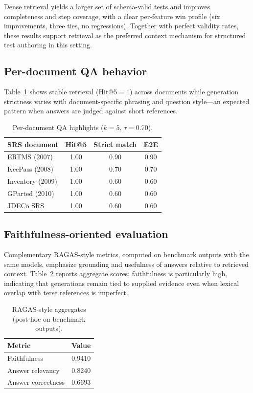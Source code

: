 \documentclass[conference]{IEEEtran}
\begin{document}
Dense retrieval yields a larger set of schema-valid tests and improves completeness and step coverage, with a clear per-feature win profile (six improvements, three ties, no regressions). Together with perfect validity rates, these results support retrieval as the preferred context mechanism for structured test authoring in this setting.

\subsection{Per-document QA behavior}

Table~\ref{tab:per_srs_results} shows stable retrieval (Hit@5${=}1$) across documents while generation strictness varies with document-specific phrasing and question style---an expected pattern when answers are judged against short references.

\begin{table}[h]
\centering
\caption{Per-document QA highlights ($k{=}5$, $\tau{=}0.70$).}
\label{tab:per_srs_results}
\begin{tabular}{lccc}
\hline
SRS document & Hit@5 & Strict match & E2E \\
\hline
ERTMS (2007) & 1.00 & 0.90 & 0.90 \\
KeePass (2008) & 1.00 & 0.70 & 0.70 \\
Inventory (2009) & 1.00 & 0.60 & 0.60 \\
GParted (2010) & 1.00 & 0.60 & 0.60 \\
JDECo SRS & 1.00 & 0.60 & 0.60 \\
\hline
\end{tabular}
\end{table}

\subsection{Faithfulness-oriented evaluation}

Complementary RAGAS-style metrics, computed on benchmark outputs with the same models, emphasize grounding and usefulness of answers relative to retrieved context. Table~\ref{tab:ragas} reports aggregate scores; faithfulness is particularly high, indicating that generations remain tied to supplied evidence even when lexical overlap with terse references is imperfect.

\begin{table}[h]
\centering
\caption{RAGAS-style aggregates (post-hoc on benchmark outputs).}
\label{tab:ragas}
\begin{tabular}{lc}
\hline
Metric & Value \\
\hline
Faithfulness & 0.9410 \\
Answer relevancy & 0.8240 \\
Answer correctness & 0.6693 \\
\hline
\end{tabular}
\end{table}
\end{document}
